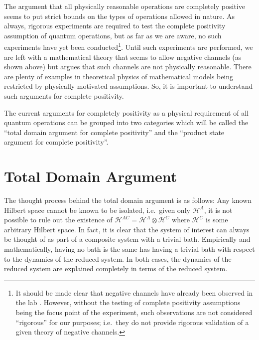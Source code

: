 The argument that all physically reasonable operations are completely positive seems to put strict bounds on the types of operations allowed in nature.  As always, rigorous experiments are required to test the complete positivity assumption of quantum operations, but as far as we are aware, no such experiments have yet been conducted\footnote{It should be made clear that negative channels have already been observed in the lab \cite{Boulant2004}.  However, without the testing of complete positivity assumptions being the focus point of the experiment, such observations are not considered ``rigorous'' for our purposes; i.e.\ they do not provide rigorous validation of a given theory of negative channels.}.  Until such experiments are performed, we are left with a mathematical theory that seems to allow negative channels (as shown above) but argues that such channels are not physically reasonable.  There are plenty of examples in theoretical physics of mathematical models being restricted by physically motivated assumptions.  So, it is important to understand such arguments for complete positivity.

The current arguments for completely positivity as a physical requirement of all quantum operations can be grouped into two categories which will be called the ``total domain argument for complete positivity'' and the ``product state argument for complete positivity''.

\section{Total Domain Argument}
\label{sec:totaldomain}

The thought process behind the total domain argument is as follows: Any known Hilbert space cannot be known to be isolated, i.e.\ given only $\mathcal{H}^A$, it is not possible to rule out the existence of $\mathcal{H}^{AC} = \mathcal{H}^A \otimes \mathcal{H}^C$ where $\mathcal{H}^C$ is some arbitrary Hilbert space.  In fact, it is clear that the system of interest can always be thought of as part of a composite system with a trivial bath.  Empirically and mathematically, having no bath is the same has having a trivial bath with respect to the dynamics of the reduced system.  In both cases, the dynamics of the reduced system are explained completely in terms of the reduced system.

